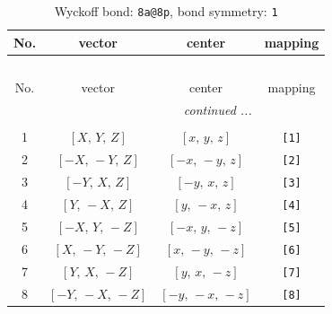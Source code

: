 \documentclass[fleqn,8pt]{jsarticle}
\begin{document}
\begin{longtable}{cccc}
\caption{Wyckoff bond: {\tt 8a@8p}, bond symmetry: {\tt 1}}
 \\
 \hline \hline
No. & vector & center & mapping \\ \hline \endfirsthead

\multicolumn{3}{l}{\tablename\ \thetable{}} \\
 \hline \hline
No. & vector & center & mapping \\ \hline \endhead

 \hline \hline
\multicolumn{3}{r}{\footnotesize\it continued ...} \\ \endfoot

 \hline \hline
\multicolumn{3}{r}{} \\ \endlastfoot

1 & $\left[ X,\, Y,\, Z \right]$ & $\left[ x,\, y,\, z \right]$ & {\tt [1]} \\ \hline
2 & $\left[ - X,\, - Y,\, Z \right]$ & $\left[ - x,\, - y,\, z \right]$ & {\tt [2]} \\ \hline
3 & $\left[ - Y,\, X,\, Z \right]$ & $\left[ - y,\, x,\, z \right]$ & {\tt [3]} \\ \hline
4 & $\left[ Y,\, - X,\, Z \right]$ & $\left[ y,\, - x,\, z \right]$ & {\tt [4]} \\ \hline
5 & $\left[ - X,\, Y,\, - Z \right]$ & $\left[ - x,\, y,\, - z \right]$ & {\tt [5]} \\ \hline
6 & $\left[ X,\, - Y,\, - Z \right]$ & $\left[ x,\, - y,\, - z \right]$ & {\tt [6]} \\ \hline
7 & $\left[ Y,\, X,\, - Z \right]$ & $\left[ y,\, x,\, - z \right]$ & {\tt [7]} \\ \hline
8 & $\left[ - Y,\, - X,\, - Z \right]$ & $\left[ - y,\, - x,\, - z \right]$ & {\tt [8]} \\
\end{longtable}
\end{document}
